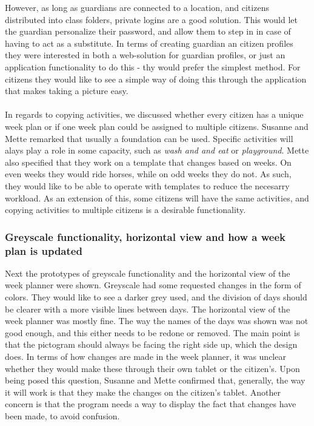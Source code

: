 However, as long as guardians are connected to a location, and citizens distributed into class folders, private logins are a good solution.
This would let the guardian personalize their password, and allow them to step in in case of having to act as a substitute.
In terms of creating guardian an citizen profiles they were interested in both a web-solution for guardian profiles, or just an application functionality to do this - thy would prefer the simplest method.
For citizens they would like to see a simple way of doing this through the application that makes taking a picture easy.
\\\\
In regards to copying activities, we discussed whether every citizen has a unique week plan or if one week plan could be assigned to multiple citizens.
Susanne and Mette remarked that usually a foundation can be used. 
Specific activities will alays play a role in some capacity, such as \textit{wash and and eat} or \textit{playground}.
Mette also specified that they work on a template that changes based on weeks. 
On even weeks they would ride horses, while on odd weeks they do not.
As such, they would like to be able to operate with templates to reduce the necesarry workload. 
As an extension of this, some citizens will have the same activities, and copying activities to multiple citizens is a desirable functionality.


\subsubsection{Greyscale functionality, horizontal view and how a week plan is updated}
Next the prototypes of greyscale functionality and the horizontal view of the week planner were shown.
Greyscale had some requested changes in the form of colors.
They would like to see a darker grey used, and the division of days should be clearer with a more visible lines between days.
The horizontal view of the week planner was mostly fine. The way the names of the days was shown was not good enough, and this either needs to be redone or removed.
The main point is that the pictogram should always be facing the right side up, which the design does.
In terms of how changes are made in the week planner, it was unclear whether they would make these through their own tablet or the citizen's.
Upon being posed this question, Susanne and Mette confirmed that, generally, the way it will work is that they make the changes on the citizen's tablet.
Another concern is that the program needs a way to display the fact that changes have been made, to avoid confusion. 


